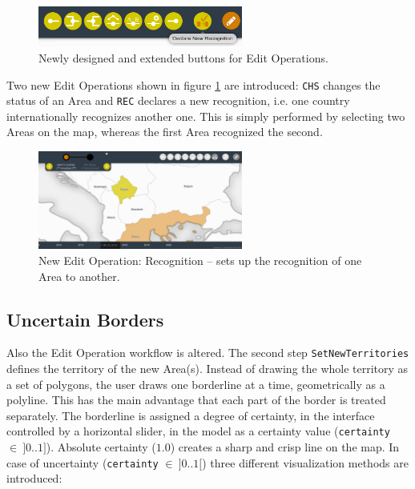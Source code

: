 \begin{figure}[ht]
  \centering
  \includegraphics[width = 0.6\textwidth]{graphics/extensions/edit_mode_extension.png}
  \caption{Newly designed and extended buttons for Edit Operations.}
  \label{fig:edit_mode_extension}
\end{figure}

Two new Edit Operations shown in figure \ref{fig:edit_mode_extension} are introduced: \texttt{CHS} changes the status of an Area and \texttt{REC} declares a new recognition, i.e. one country internationally recognizes another one. This is simply performed by selecting two Areas on the map, whereas the first Area recognized the second.

\begin{figure}[ht]
  \centering
  \includegraphics[width=0.6\textwidth]{graphics/extensions/operation_REC}
  \caption{New Edit Operation: Recognition -- sets up the recognition of one Area to another.}
  \label{fig:uncertainty_operation_REC}
\end{figure}


\subsection{Uncertain Borders} %
\label{sub:uncertain_borders}

Also the Edit Operation workflow is altered. The second step \texttt{SetNewTerritories} defines the territory of the new Area(s). Instead of drawing the whole territory as a set of polygons, the user draws one borderline at a time, geometrically as a polyline. This has the main advantage that each part of the border is treated separately. The borderline is assigned a degree of certainty, in the interface controlled by a horizontal slider, in the model as a certainty value (\texttt{certainty} $\in~]0 .. 1]$). Absolute certainty ($1.0$) creates a sharp and crisp line on the map. In case of uncertainty (\texttt{certainty} $\in~]0..1[$) three different visualization methods are introduced:

